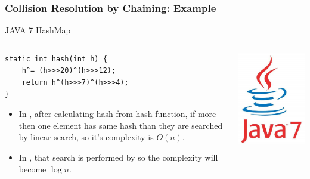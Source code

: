 \documentclass[UTF8,11pt]{beamer}
\begin{document}
\begin{frame}[fragile]
\frametitle{Collision Resolution by Chaining: Example}
\begin{block}{JAVA 7 HashMap}
	
	\begin{columns}
		\begin{column}{0.7\textwidth}
\begin{lstlisting}[style=styleJ]
static int hash(int h) {
    h^= (h>>>20)^(h>>>12);
    return h^(h>>>7)^(h>>>4);
}
\end{lstlisting}
			\begin{itemize}
				\item In , after calculating hash from hash function, if more then one element has same hash than they are searched by linear search, so it's complexity is $O(n)$.
				
				\item In , that search is performed by \textbf{} so the complexity will become $\log{n}$.
			\end{itemize}
		\end{column}
		\begin{column}{0.25\textwidth}
			\includegraphics[width=\linewidth]{figs/java7.png}
		\end{column}
	\end{columns}
\end{block}
\end{frame}
\end{document}

